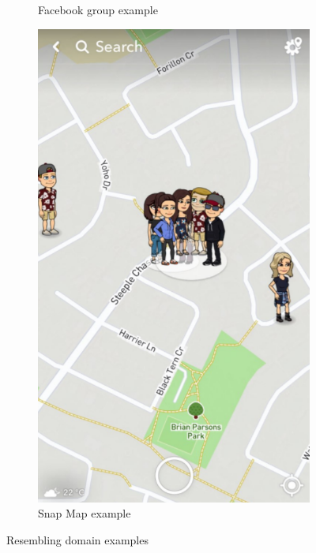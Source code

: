 \begin{figure}[H]
\begin{subfigure}{0.32\textwidth}
    \caption{Facebook group example}
    \end{subfigure}
    \begin{subfigure}{0.32\textwidth}
    \centering
    \includegraphics[width=0.8\linewidth]{images/SnapMap.png} 
    \caption{Snap Map example}
    \end{subfigure}
    \caption{Resembling domain examples}
    \label{fig:domains}
\end{figure}